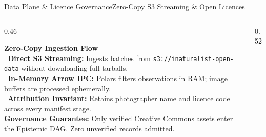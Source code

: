 \documentclass[aspectratio=169,10pt]{beamer}
\begin{document}
\begin{frame}{Data Plane \& Licence Governance}{Zero-Copy S3 Streaming \& Open Licences}
    \begin{columns}[T]
        \begin{column}{0.46\textwidth}
            \begin{card}
                \textbf{\color{BlueAccent} Zero-Copy Ingestion Flow}\\[2pt]
                \textbullet\ \textbf{Direct S3 Streaming:} Ingests batches from \texttt{s3://inaturalist-open-data} without downloading full tarballs.\\[2pt]
                \textbullet\ \textbf{In-Memory Arrow IPC:} Polars filters observations in RAM; image buffers are processed ephemerally.\\[2pt]
                \textbullet\ \textbf{Attribution Invariant:} Retains photographer name and licence code across every manifest stage.\\[3pt]
                \textbf{\color{GreenAccent} Governance Guarantee:} Only verified Creative Commons assets enter the Epistemic DAG. Zero unverified records admitted.
            \end{card}
        \end{column}

        \begin{column}{0.52\textwidth}
            \centering
\end{column}
\end{columns}
\end{frame}
\end{document}
